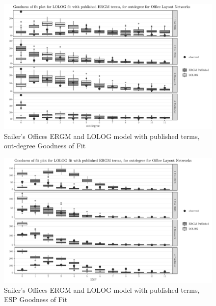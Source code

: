 \documentclass[
]{statsoc}
\begin{document}
\begin{figure}[h]

{\centering \includegraphics{lolog_catelog_writeup_JRSSA_major_revisions_git_files/figure-latex/unnamed-chunk-10-1} 

}

\caption{\label{fig:sailer_gof_pub_odeg} Sailer's Offices ERGM and LOLOG model with published terms, out-degree Goodness of Fit}\label{fig:unnamed-chunk-10}
\end{figure}

\begin{figure}[h]

{\centering \includegraphics{lolog_catelog_writeup_JRSSA_major_revisions_git_files/figure-latex/unnamed-chunk-11-1} 

}

\caption{\label{fig:sailer_gof_pub_esp} Sailer's Offices ERGM and LOLOG model with published terms, ESP Goodness of Fit}\label{fig:unnamed-chunk-11}
\end{figure}
\end{document}
